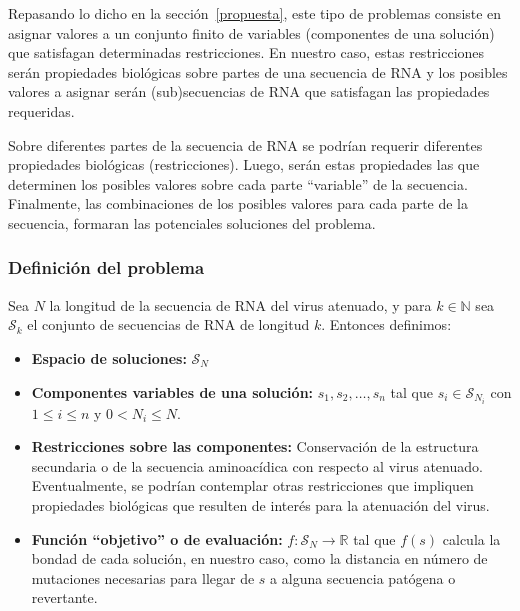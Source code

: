 Repasando lo dicho en la secci\'on~\ref{propuesta}, este tipo de problemas
consiste en asignar valores a un conjunto finito de variables (componentes de
una soluci\'on) que satisfagan determinadas restricciones. En nuestro caso,
estas restricciones ser\'an propiedades biol\'ogicas sobre partes de una
secuencia de \ac{RNA} y los posibles valores a asignar ser\'an (sub)secuencias
de \ac{RNA} que satisfagan las propiedades requeridas.

Sobre diferentes partes de la secuencia de \ac{RNA} se podr\'ian requerir
diferentes propiedades biol\'ogicas (restricciones). Luego, ser\'an estas
propiedades las que determinen los posibles valores sobre cada parte
``variable'' de la secuencia. Finalmente, las combinaciones de los posibles
valores para cada parte de la secuencia, formaran las potenciales soluciones del
problema.

\subsubsection{Definici\'on del problema}

Sea $N$ la longitud de la secuencia de \ac{RNA} del virus atenuado, y para $k
\in \mathbb{N}$ sea $\mathcal{S}_{k}$ el conjunto de secuencias de \ac{RNA} de
longitud $k$. Entonces definimos:

\begin{itemize} 
 \item \textbf{Espacio de soluciones:} $\mathcal{S}_{N}$

 \item \textbf{Componentes variables de una soluci\'on:} $s_{1},s_{2}, \dots,
s_{n}$ tal que $s_{i} \in \mathcal{S}_{N_{i}}$ con $1 \le i \le n$ y $0 < N_{i}
\le N$.

 \item \textbf{Restricciones sobre las componentes:} Conservaci\'on de la
estructura secundaria o de la secuencia aminoac\'idica con respecto al virus
atenuado. Eventualmente, se podr\'ian contemplar otras restricciones que
impliquen propiedades biol\'ogicas que resulten de inter\'es para la
atenuaci\'on del virus.

 \item \textbf{Funci\'on ``objetivo'' o de evaluaci\'on:} $f: \mathcal{S}_{N}
\rightarrow \mathbb{R}$ tal que $f(s)$ calcula la bondad de cada soluci\'on, en
nuestro caso, como la distancia en n\'umero de mutaciones necesarias para
llegar de $s$ a alguna secuencia pat\'ogena o revertante.
\end{itemize}

